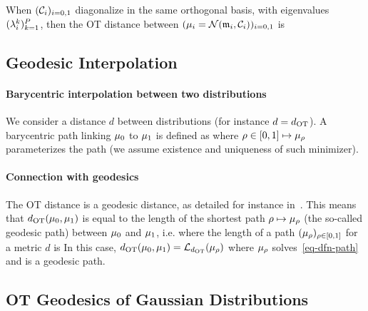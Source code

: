 When $(\mathcal{C}_i)_{i=0,1}$ diagonalize in the same orthogonal basis, with eigenvalues $(\lambda_i^k)_{k=1}^P$, then the OT distance between $(\mu_i = \mathcal{N}({\frak m}_i,\mathcal{C}_i))_{i=0,1}$ is


\subsection{Geodesic Interpolation}

\paragraph{Barycentric interpolation between two distributions}

We consider a distance $d$ between distributions (for instance $d=d_{\text{OT}}$). A barycentric path linking $\mu_0$ to $\mu_1$ is defined as
where $\rho \in [0,1] \mapsto \mu_\rho$ parameterizes the path (we assume existence and uniqueness of such minimizer).

\paragraph{Connection with geodesics}

The OT distance is a geodesic distance, as detailed for instance in~\cite[Section 5.1]{villani-topics}. This means that $d_{\text{OT}}(\mu_0,\mu_1)$ is equal to the length of the shortest path $\rho \mapsto \mu_\rho$ (the so-called geodesic path) between $\mu_0$ and $\mu_1$, i.e.
where the length of a path $(\mu_\rho)_{\rho \in [0,1]}$ for a metric $d$ is
In this case, $d_{\text{OT}}(\mu_0,\mu_1) = \mathcal{L}_{d_\text{OT}}(\mu_\rho)$ where $\mu_\rho$ solves~\eqref{eq-dfn-path} and is a geodesic path.


\subsection{OT Geodesics of Gaussian Distributions}

